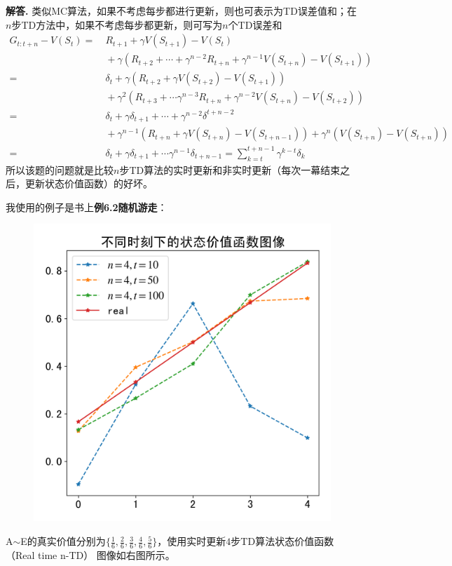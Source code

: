 \documentclass[12pt, a4paper, oneside]{ctexart}
\newenvironment{solution}[1][]{\par\noindent\textbf{#1解答. }}{\smallskip\par}  %
\def\tsty{\textstyle}       %
\begin{document}
\begin{solution}
    类似MC算法，如果不考虑每步都进行更新，则也可表示为TD误差值和；在$n$步TD方法中，如果不考虑每步都更新，则可写为$n$个TD误差和
    \begin{align*}
        G_{t:t+n} - V(S_t) =&\ R_{t+1}+\gamma V(S_{t+1})-V(S_t)\\
        &\ + \gamma(R_{t+2}+\cdots+\gamma^{n-2}R_{t+n}+\gamma^{n-1}V(S_{t+n})-V(S_{t+1}))\\
        =&\ \delta_t + \gamma(R_{t+2}+\gamma V(S_{t+2}) - V(S_{t+1}))\\
        &\ + \gamma^2(R_{t+3}+\cdots\gamma^{n-3}R_{t+n}+\gamma^{n-2}V(S_{t+n})-V(S_{t+2}))\\
        =&\ \delta_t+\gamma\delta_{t+1}+\cdots+\gamma^{n-2}\delta^{t+n-2}\\
        &\ +\gamma^{n-1}(R_{t+n}+\gamma V(S_{t+n})-V(S_{t+n-1})) + \gamma^n(V(S_{t+n}) - V(S_{t+n}))\\
        =&\ \delta_t + \gamma\delta_{t+1}+\cdots\gamma^{n-1}\delta_{t+n-1} = \sum_{k=t}^{t+n-1}\gamma^{k-t}\delta_k
    \end{align*}
    所以该题的问题就是比较$n$步TD算法的实时更新和非实时更新（每次一幕结束之后，更新状态价值函数）的好坏。

    我使用的例子是书上\textbf{例6.2随机游走}：

    \begin{figure} %
        \vspace*{-2cm}
        \includegraphics[scale=0.6]{code142/state value function in diff time.png}
    \end{figure}
    \noindent A$\sim$E的真实价值分别为$\tsty\{\frac{1}{6},\frac{2}{6},\frac{3}{6},\frac{4}{6},\frac{5}{6}\}$，使用实时更新$4$步TD算法状态价值函数（Real time n-TD）
    图像如右图所示。


\end{solution}
\end{document}
